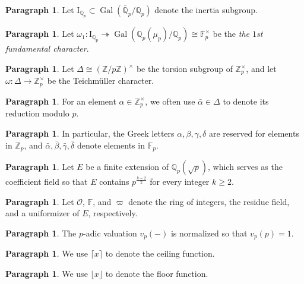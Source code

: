 \documentclass[12pt]{amsart}
\theoremstyle{definition}
\newtheorem{para}[subsection]{Paragraph}
\numberwithin{equation}{subsection}
\def\calO{\mathcal{O}}
\def\FF{\mathbb{F}}
\def\QQ{\mathbb{Q}}
\def\ZZ{\mathbb{Z}}
\def\rmI{\mathrm{I}}
\DeclareMathOperator{\Gal}{Gal}
\begin{document}
\begin{para}
\label{P:para_032}
Let $\rmI_{\QQ_p}\subset \Gal(\overline{\QQ}_p/\QQ_p)$ denote the inertia subgroup.
\end{para}

\begin{para}
\label{P:para_033}
Let $\omega_1: \rmI_{\QQ_p} \twoheadrightarrow\Gal(\QQ_p(\mu_p)/\QQ_p) \cong \FF_p^\times$ be the \emph{the $1$st fundamental character}.
\end{para}

\begin{para}
\label{P:para_034}
Let $\Delta \cong (\ZZ/p\ZZ)^\times$ be the torsion subgroup of
$\ZZ_p^\times$, and let $\omega:\Delta\rightarrow \ZZ_p^\times$ be the
Teichm\"{u}ller character.
\end{para}

\begin{para}
\label{P:para_035}
For an element $\alpha \in \ZZ_p^\times$, we often use $\bar \alpha \in \Delta $ to denote its reduction modulo $p$.
\end{para}

\begin{para}
\label{P:para_036}
In particular, the Greek letters $\alpha, \beta, \gamma, \delta$ are reserved for elements in $\ZZ_p$, and $\bar \alpha, \bar \beta, \bar \gamma, \bar \delta$ denote elements in $\FF_p$.
\end{para}

\begin{para}
\label{P:para_037}
Let $E$ be a finite extension of $\QQ_p(\sqrt p)$, which serves as the coefficient field so that $E$ contains $p^{\frac{k-2}{2}}$ for every integer $k\geq 2$.
\end{para}

\begin{para}
\label{P:para_038}
Let $\calO$, $\FF$, and $\varpi$ denote the ring of integers, the residue field, and a uniformizer of $E$, respectively.
\end{para}

\begin{para}
\label{P:para_039}
The $p$-adic valuation $v_p(-)$ is normalized so that $v_p(p) =1$.
\end{para}

\begin{para}
\label{P:para_040}
We use $\lceil x\rceil$ to denote the ceiling function.
\end{para}

\begin{para}
\label{P:para_041}
We use $\lfloor x\rfloor$ to denote the floor function.
\end{para}
\end{document}
